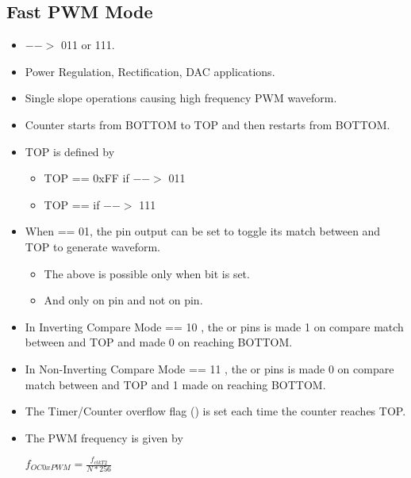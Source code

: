 \subsection{Fast PWM Mode}
\begin{itemize}
    \item {} $-->$ 011 or 111.
    \item Power Regulation, Rectification, DAC applications.
    \item Single slope operations causing high frequency PWM waveform.
    \item Counter starts from BOTTOM to TOP and then restarts from BOTTOM.
    \item TOP is defined by
    \begin{itemize}
        \item TOP == 0xFF if  $-->$ 011
        \item TOP ==  if  $-->$ 111
    \end{itemize}
    \item  When  == 01, the  pin output can be set to toggle its match between  and TOP to generate waveform.
    \begin{itemize}
        \item The above is possible only when  bit is set.
        \item And only on  pin and not on  pin.
    \end{itemize}
    \item In Inverting Compare Mode  == 10 , the  or  pins is made 1 on compare match between  and TOP and made 0 on reaching BOTTOM.
    \item In Non-Inverting Compare Mode  == 11 , the  or  pins is made 0 on compare match between  and TOP and 1 made  on reaching BOTTOM.
    \item The Timer/Counter overflow flag () is set each time the counter reaches TOP.
    \item The PWM frequency is given by 
    \begin{center}
        { \Large $f_{OC0xPWM} = \frac{f_{clkT2}}{N * 256}$ }
    \end{center}
\end{itemize}

